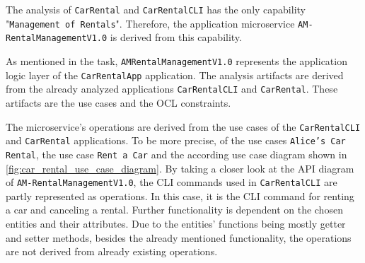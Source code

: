 The analysis of \texttt{CarRental} and \texttt{CarRentalCLI} has the only capability "\texttt{Management of Rentals}".
Therefore, the application microservice \texttt{AM-RentalManagementV1.0} is derived from this capability.

As mentioned in the task, \texttt{AMRentalManagementV1.0} represents the application logic layer of the \texttt{CarRentalApp} application.
The analysis artifacts are derived from the already analyzed applications \texttt{CarRentalCLI} and \texttt{CarRental}.
These artifacts are the use cases and the OCL constraints.

The microservice's operations are derived from the use cases of the \texttt{CarRentalCLI} and \texttt{CarRental} applications.
To be more precise, of the use cases \texttt{Alice's Car Rental}, the use case \texttt{Rent a Car} and the according use case diagram shown in \autoref*{fig:car_rental_use_case_diagram}.
By taking a closer look at the API diagram of \texttt{AM-RentalManagementV1.0}, the CLI commands used in \texttt{CarRentalCLI} are partly represented as operations.
In this case, it is the CLI command for renting a car and canceling a rental.
Further functionality is dependent on the chosen entities and their attributes.
Due to the entities' functions being mostly getter and setter methods, besides the already mentioned functionality, the operations are not derived from already existing operations.